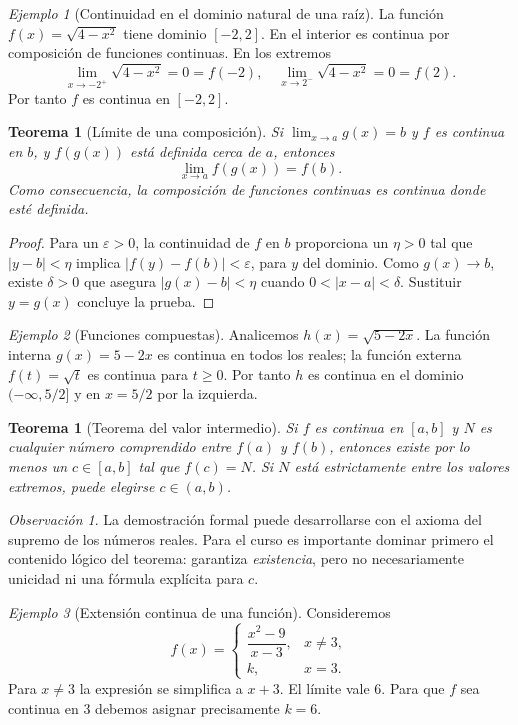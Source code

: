 \documentclass[12pt]{article}
\newtheorem{teorema}[definicion]{Teorema}
\theoremstyle{remark}
\newtheorem{observacion}{Observación}
\newtheorem{ejemplo}{Ejemplo}
\begin{document}
\begin{ejemplo}[Continuidad en el dominio natural de una raíz]
La función $f(x)=\sqrt{4-x^2}$ tiene dominio $[-2,2]$. En el interior es continua por composición de funciones continuas. En los extremos
\[
 \lim_{x\to-2^+}\sqrt{4-x^2}=0=f(-2),\quad
 \lim_{x\to2^-}\sqrt{4-x^2}=0=f(2).
\]
Por tanto $f$ es continua en $[-2,2]$.
\end{ejemplo}

\begin{teorema}[Límite de una composición]
Si $\lim_{x\to a}g(x)=b$ y $f$ es continua en $b$, y $f(g(x))$ está definida cerca de $a$, entonces
\[
 \lim_{x\to a}f(g(x))=f(b).
\]
Como consecuencia, la composición de funciones continuas es continua donde esté definida.
\end{teorema}
\begin{proof}
Para un $\varepsilon>0$, la continuidad de $f$ en $b$ proporciona un $\eta>0$ tal que $|y-b|<\eta$ implica $|f(y)-f(b)|<\varepsilon$, para $y$ del dominio. Como $g(x)\to b$, existe $\delta>0$ que asegura $|g(x)-b|<\eta$ cuando $0<|x-a|<\delta$. Sustituir $y=g(x)$ concluye la prueba.
\end{proof}

\begin{ejemplo}[Funciones compuestas]
Analicemos $h(x)=\sqrt{5-2x}$. La función interna $g(x)=5-2x$ es continua en todos los reales; la función externa $f(t)=\sqrt t$ es continua para $t\ge0$. Por tanto $h$ es continua en el dominio $(-\infty,5/2]$ y en $x=5/2$ por la izquierda.
\end{ejemplo}

\begin{teorema}[Teorema del valor intermedio]
Si $f$ es continua en $[a,b]$ y $N$ es cualquier número comprendido entre $f(a)$ y $f(b)$, entonces existe por lo menos un $c\in[a,b]$ tal que $f(c)=N$. Si $N$ está estrictamente entre los valores extremos, puede elegirse $c\in(a,b)$.
\end{teorema}

\begin{observacion}
La demostración formal puede desarrollarse con el axioma del supremo de los números reales. Para el curso es importante dominar primero el contenido lógico del teorema: garantiza \emph{existencia}, pero no necesariamente unicidad ni una fórmula explícita para $c$.
\end{observacion}
\begin{ejemplo}[Extensión continua de una función]
Consideremos
\[
f(x)=\begin{cases}
\dfrac{x^2-9}{x-3},&x\ne3,\\
k,&x=3.
\end{cases}
\]
Para $x\ne3$ la expresión se simplifica a $x+3$. El límite vale $6$. Para que $f$ sea continua en $3$ debemos asignar precisamente $\boxed{k=6}$.
\end{ejemplo}
\end{document}
